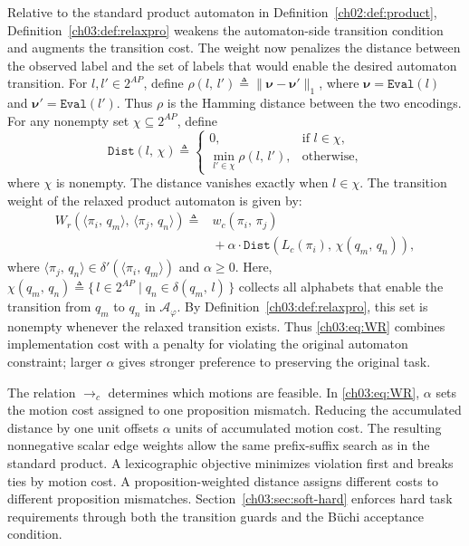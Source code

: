 Relative to the standard product automaton in
Definition~\ref{ch02:def:product}, Definition~\ref{ch03:def:relaxpro} weakens
the automaton-side transition condition and augments the transition cost. The
weight now penalizes the distance between the observed label and the set of
labels that would enable the desired automaton transition.
 For $l,l' \in 2^{AP}$, define
$\rho(l,\, l') \triangleq \|\boldsymbol{\nu} - \boldsymbol{\nu}'\|_{1}$,
where $\boldsymbol{\nu} = \texttt{Eval}(l)$ and
$\boldsymbol{\nu}' = \texttt{Eval}(l')$. Thus $\rho$ is the Hamming distance
between the two encodings. For any nonempty set $\chi \subseteq 2^{AP}$, define
\begin{equation}
\texttt{Dist}(l,\, \chi) \triangleq
\begin{cases}
0, & \text{if } l \in \chi, \\
\min_{l' \in \chi} \rho(l,\, l'), & \text{otherwise},
\end{cases}
\label{ch03:eq:setdist}
\end{equation}
where $\chi$ is nonempty. The distance vanishes exactly when $l \in \chi$.
The transition weight of the relaxed product automaton is given by:
\begin{equation}
\begin{aligned}
W_r(\langle \pi_i,\, q_m \rangle,\,
\langle \pi_j,\, q_n \rangle)
\triangleq {} & w_c(\pi_i,\, \pi_j) \\
& {} + \alpha \cdot
\texttt{Dist}(L_c(\pi_i),\, \chi(q_m,\, q_n)),
\end{aligned}
\label{ch03:eq:WR}
\end{equation}
where $\langle \pi_j,\, q_n \rangle \in
\delta'(\langle \pi_i,\, q_m \rangle)$ and $\alpha \geq 0$. Here,
$\chi(q_m,\, q_n) \triangleq
\{\, l \in 2^{AP} \mid q_n \in \delta(q_m,\, l) \,\}$ collects all alphabets
that enable the transition from $q_m$ to $q_n$ in
$\mathcal{A}_{\varphi}$. By Definition~\ref{ch03:def:relaxpro}, this set is
nonempty whenever the relaxed transition exists. Thus
\eqref{ch03:eq:WR} combines implementation cost with a penalty for violating
the original automaton constraint; larger $\alpha$ gives stronger preference to
preserving the original task.

\begin{revision}
The relation $\longrightarrow_c$ determines which motions are feasible.
In \eqref{ch03:eq:WR}, $\alpha$ sets the motion cost assigned to one
proposition mismatch. Reducing the accumulated distance by one unit offsets
$\alpha$ units of accumulated motion cost. The resulting nonnegative scalar
edge weights allow the same prefix-suffix search as in the standard product.
A lexicographic objective minimizes violation first and breaks ties by motion
cost. A proposition-weighted distance assigns different costs to different
proposition mismatches. Section~\ref{ch03:sec:soft-hard} enforces hard task
requirements through both the transition guards and the B\"uchi acceptance
condition.
\end{revision}

